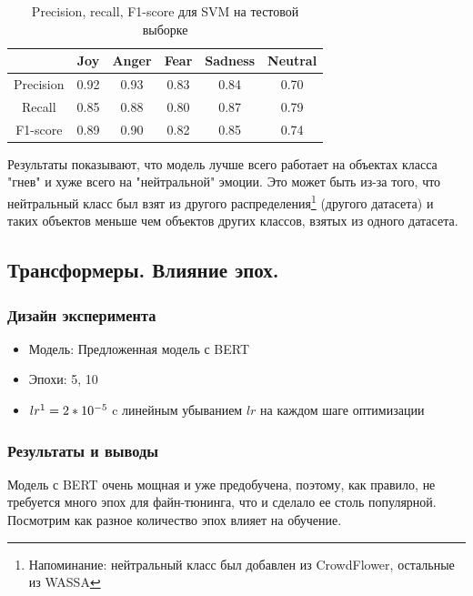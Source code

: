 \documentclass{article}
\begin{document}
\begin{table}[h!]
    \centering
    \begin{tabular}{|c|c|c|c|c|c|}
        \hline
            & Joy & Anger & Fear & Sadness & Neutral \\
        \hline
            Precision & 0.92 &  0.93 & 0.83 & 0.84 & 0.70\\
        \hline
            Recall  &  0.85 & 0.88 & 0.80 & 0.87 & 0.79\\
        \hline
            F1-score & 0.89 &  0.90 & 0.82 & 0.85 & 0.74\\
        \hline
    \end{tabular}
    \caption{Precision, recall, F1-score для SVM на тестовой выборке}
    \label{table:table4}
\end{table}

Результаты показывают, что модель лучше всего работает на объектах класса "гнев"{} и хуже всего на "нейтральной"{} эмоции. Это может быть из-за того, что нейтральный класс был взят из другого распределения\footnote{Напоминание: нейтральный класс был добавлен из CrowdFlower, остальные из WASSA} (другого датасета) и таких объектов меньше чем объектов других классов, взятых из одного датасета.

\subsection{Трансформеры. Влияние эпох.}
\subsubsection{Дизайн эксперимента}
\begin{itemize}
    \item Модель: Предложенная модель с BERT
    \item Эпохи: 5, 10
    \item $lr\footnotemark = 2*10^{-5}$ c линейным убыванием $lr$ на каждом шаге оптимизации
\end{itemize}

\subsubsection{Результаты и выводы}
Модель с BERT очень мощная и уже предобучена, поэтому, как правило, не требуется много эпох для файн-тюнинга, что и сделало ее столь популярной. Посмотрим как разное количество эпох влияет на обучение.
\end{document}

